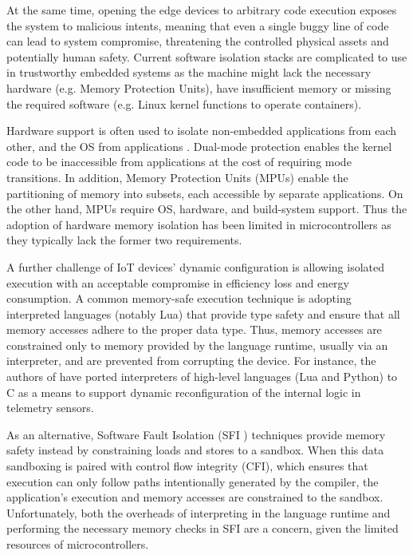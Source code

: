 At the same time, opening the edge devices to arbitrary code execution exposes the system to malicious intents, meaning that even a single buggy line of code can lead to system compromise, threatening the controlled physical assets and potentially human safety. Current software isolation stacks are complicated to use in trustworthy embedded systems as the machine might lack the necessary hardware (e.g. Memory Protection Units), have insufficient memory or missing the required software (e.g. Linux kernel functions to operate containers). 

Hardware support is often used to isolate non-embedded applications from each other, and the OS from applications \cite{peach2020ewasm}. Dual-mode protection enables the kernel code to be inaccessible from applications at the cost of requiring mode transitions. In addition, Memory Protection Units (MPUs) enable the partitioning of memory into subsets, each accessible by separate applications. 
On the other hand, MPUs require OS, hardware, and build-system support. Thus the adoption of hardware memory isolation has been limited in microcontrollers as they typically lack the former two requirements.

A further challenge of IoT devices' dynamic configuration is allowing isolated execution with an acceptable compromise in efficiency loss and energy consumption. A common memory-safe execution technique is adopting interpreted languages (notably Lua) that provide type safety and ensure that all memory accesses adhere to the proper data type. Thus, memory accesses are constrained only to memory provided by the language runtime, usually via an interpreter, and are prevented from corrupting the device. For instance, the authors of \cite{brzoza2016embedded} have ported interpreters of high-level languages (Lua and Python) to C as a means to support dynamic reconfiguration of the internal logic in telemetry sensors.

As an alternative, Software Fault Isolation (SFI \cite{wahbe1993efficient}) techniques provide memory safety instead by constraining loads and stores to a sandbox. When this data sandboxing is paired with control flow integrity (CFI), which ensures that execution can only follow paths intentionally generated by the compiler, the application's execution and memory accesses are constrained to the sandbox. Unfortunately, both the overheads of interpreting in the language runtime and performing the necessary memory checks in SFI are a concern, given the limited resources of microcontrollers.

